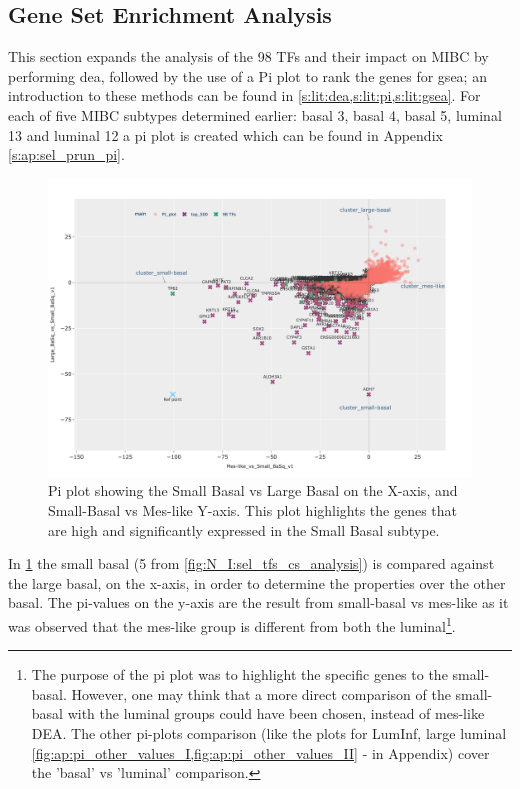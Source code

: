 \subsection{Gene Set Enrichment Analysis} \label{s:N_I:sel_tfs_subtypes}


This section expands the analysis of the 98 TFs and their impact on MIBC by performing \acrfull{dea}, followed by the use of a Pi plot to rank the genes for \acrfull{gsea}; an introduction to these methods can be found in \cref{s:lit:dea,s:lit:pi,s:lit:gsea}. For each of five MIBC subtypes determined earlier: basal 3, basal 4, basal 5, luminal 13 and luminal 12 a pi plot is created which can be found in Appendix \cref{s:ap:sel_prun_pi}.


\begin{figure}[!htb]   
    \centering
    \includegraphics[width=1.0\textwidth,keepaspectratio]{Sections/Network_I/Resources/selective_pruning/pi_gsea/pi_smallBasal.png}
      \caption{Pi plot showing the Small Basal vs Large Basal on the X-axis, and Small-Basal vs Mes-like Y-axis. This plot highlights the genes that are high and significantly expressed in the Small Basal subtype. }
    \label{fig:N_I:pi_smallBasal_comp}
\end{figure}

In \cref{fig:N_I:pi_smallBasal_comp} the small basal (5 from \cref{fig:N_I:sel_tfs_cs_analysis}) is compared against the large basal, on the x-axis, in order to determine the properties over the other basal. The pi-values on the y-axis are the result from small-basal vs mes-like as it was observed that the mes-like group is different from both the luminal\footnote{The purpose of the pi plot was to highlight the specific genes to the small-basal. However, one may think that a more direct comparison of the small-basal with the luminal groups could have been chosen, instead of mes-like DEA. The other pi-plots comparison (like the plots for LumInf,  large luminal \cref{fig:ap:pi_other_values_I,fig:ap:pi_other_values_II} - in Appendix) cover the 'basal' vs 'luminal' comparison. }. 


